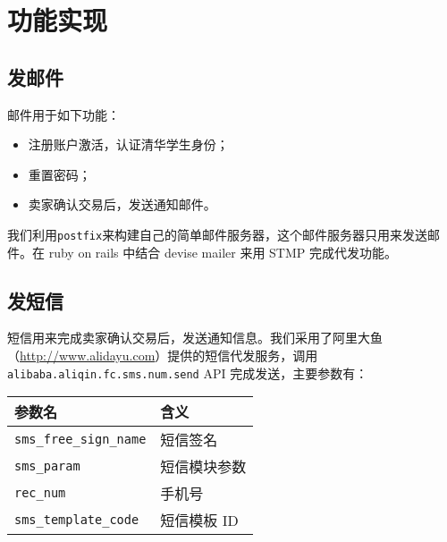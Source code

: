 \section{功能实现}

\subsection{发邮件}

邮件用于如下功能：

\begin{itemize}
    \item 注册账户激活，认证清华学生身份；
    \item 重置密码；
    \item 卖家确认交易后，发送通知邮件。
\end{itemize}

我们利用\texttt{postfix}来构建自己的简单邮件服务器，这个邮件服务器只用来发送邮件。在 ruby on rails 中结合 devise mailer 来用 STMP 完成代发功能。

\subsection{发短信}

短信用来完成卖家确认交易后，发送通知信息。我们采用了阿里大鱼（\url{http://www.alidayu.com}）提供的短信代发服务，调用\texttt{alibaba.aliqin.fc.sms.num.send} API 完成发送，主要参数有：

\begin{center}
    \begin{tabular}{ll}
        \toprule
            参数名 & 含义 \\
        \midrule
            \texttt{sms\_free\_sign\_name} & 短信签名 \\
            \texttt{sms\_param} & 短信模块参数 \\
            \texttt{rec\_num} & 手机号 \\
            \texttt{sms\_template\_code} & 短信模板 ID \\
        \bottomrule
    \end{tabular}
\end{center}
